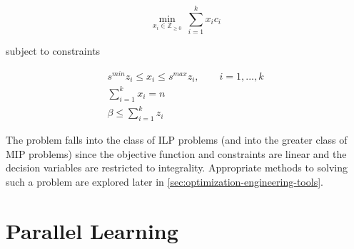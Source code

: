 \documentclass[../mthe-493-final-project.tex]{subfiles}
\begin{document}
    \begin{equation}
        \label{eq:optimization-objective-function-simplified}
        \min_{x_i \in \mathbb{Z}_{\geq 0}} \ \sum_{i=1}^k x_i c_i
    \end{equation}

    subject to constraints

    \begin{align}
        s^{min}z_i \leq x_i \leq s^{max}z_i, \qquad i=1,...,k \label{eq:simplified-optimization-constraint-1} \\
        \sum_{i = 1}^k x_i = n \label{eq:simplified-optimization-constraint-2} \qquad \qquad \qquad\\
        \beta \leq \sum_{i = 1}^k z_i \label{eq:simplified-optimization-constraint-3} \qquad \qquad \qquad
    \end{align}

    The problem falls into the class of ILP problems (and into the greater class of MIP problems) since the objective function and constraints are linear and the decision variables are restricted to integrality. Appropriate methods to solving such a problem are explored later in \autoref{sec:optimization-engineering-tools}.

    \section{Parallel Learning}
    \label{sec:parallel-learning-problem-description}

    
\end{document}
